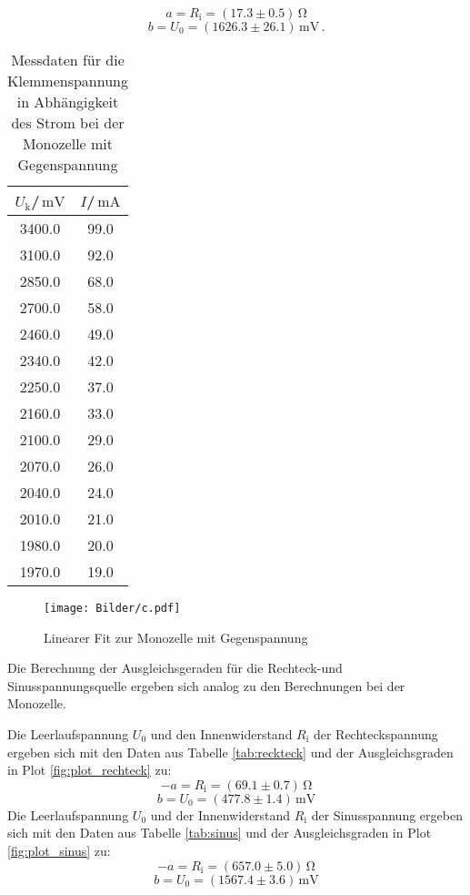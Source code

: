 \begin{equation*}
  a= R_\text{i}=(17.3\pm 0.5)\,\si{\ohm}
\end{equation*}
\begin{equation*}
  b =U_\text{0}=(1626.3\pm 26.1)\,\si{\milli\volt}\,.
\end{equation*}
\begin{table}[h]
  \centering
  \caption{Messdaten für die Klemmenspannung in Abhängigkeit des Strom bei der Monozelle mit Gegenspannung}
  \label{tab:monozelle_belastet}
\begin{tabular}{cc}
  \toprule
$U_\text{k}$/$\,\si{\milli\volt}$ & $I$/$\,\si{\milli\ampere}$\\
\midrule
3400.0 & 99.0 \\
3100.0 & 92.0 \\
2850.0 & 68.0 \\
2700.0 & 58.0 \\
2460.0 & 49.0 \\
2340.0 & 42.0 \\
2250.0 & 37.0 \\
2160.0 & 33.0 \\
2100.0 & 29.0 \\
2070.0 & 26.0 \\
2040.0 & 24.0 \\
2010.0 & 21.0 \\
1980.0 & 20.0 \\
1970.0 & 19.0 \\
\bottomrule
\end{tabular}
\end{table}
\begin{figure}[h]
\texttt{[image: Bilder/c.pdf]}
\caption{Linearer Fit zur Monozelle mit Gegenspannung}
\label{fig:plot_monozellebelastet}
\end{figure}

Die Berechnung der Ausgleichsgeraden für die Rechteck-und Sinusspannungsquelle ergeben sich analog zu den Berechnungen bei der Monozelle.


Die Leerlaufspannung $U_\text{0}$ und den Innenwiderstand $R_\text{i}$ der Rechteckspannung ergeben sich mit den Daten aus Tabelle \ref{tab:reckteck} und der Ausgleichsgraden in Plot \ref{fig:plot_rechteck} zu:
\begin{equation*}
  -a= R_\text{i}=(69.1\pm0.7)\,\si{\ohm}
\end{equation*}
\begin{equation*}
  b =U_\text{0}=(477.8\pm1.4)\,\si{\milli\volt}
\end{equation*}
Die Leerlaufspannung $U_\text{0}$ und der Innenwiderstand $R_\text{i}$ der Sinusspannung ergeben sich mit den Daten aus Tabelle \ref{tab:sinus} und der Ausgleichsgraden in Plot \ref{fig:plot_sinus} zu:
\begin{equation*}
  -a= R_\text{i}=(657.0± 5.0)\,\si{\ohm}
\end{equation*}
\begin{equation*}
  b =U_\text{0}=(1567.4\pm3.6)\,\si{\milli\volt}
\end{equation*}

